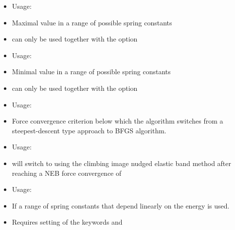 {\begin{itemize}
    \item Usage:  
    \item Maximal value in a range of possible spring constants
    \item can only be used together with the option \\
       
\end{itemize}}

{\begin{itemize}
    \item Usage:  
    \item Minimal value in a range of possible spring constants
    \item can only be used together with the option \\
       
\end{itemize}}

{\begin{itemize}
    \item Usage:  
    \item Force convergence criterion below which the algorithm switches
          from a steepest-descent type approach to BFGS algorithm. 
 \end{itemize}}

{\begin{itemize}
    \item Usage:  
    \item will switch to using the climbing image nudged elastic band method
      after reaching a NEB force convergence of 
\end{itemize}}

{\begin{itemize}
    \item Usage:  
    \item If  a range of spring constants that depend linearly on the 
      energy \cite{HenkelmanJCP2000a} is used. 
    \item {} Requires setting of the keywords  and 
\end{itemize}}

